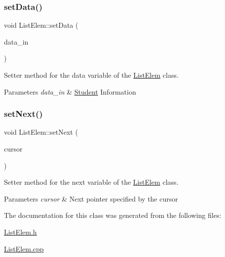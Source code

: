 \subsubsection{\texorpdfstring{set\+Data()}{setData()}}
{\footnotesize\ttfamily void List\+Elem\+::set\+Data (\begin{DoxyParamCaption}\item[{const \hyperlink{class_student}{Student} \&}]{data\+\_\+in }\end{DoxyParamCaption})}



Setter method for the \textquotesingle{}data\textquotesingle{} variable of the \hyperlink{class_list_elem}{List\+Elem} class. 


\begin{DoxyParams}{Parameters}
{\em data\+\_\+in} & \hyperlink{class_student}{Student} Information \\
\hline
\end{DoxyParams}
\mbox{\label{class_list_elem_a8dcd5f6f4d561bb0e4c9c5431f550caf}} 
\subsubsection{\texorpdfstring{set\+Next()}{setNext()}}
{\footnotesize\ttfamily void List\+Elem\+::set\+Next (\begin{DoxyParamCaption}\item[{\hyperlink{class_list_elem}{List\+Elem} $\ast$const}]{cursor }\end{DoxyParamCaption})}



Setter method for the \textquotesingle{}next\textquotesingle{} variable of the \hyperlink{class_list_elem}{List\+Elem} class. 


\begin{DoxyParams}{Parameters}
{\em cursor} & Next pointer specified by the cursor \\
\hline
\end{DoxyParams}


The documentation for this class was generated from the following files\+:\begin{DoxyCompactItemize}
\item 
\hyperlink{_list_elem_8h}{List\+Elem.\+h}\item 
\hyperlink{_list_elem_8cpp}{List\+Elem.\+cpp}\end{DoxyCompactItemize}
